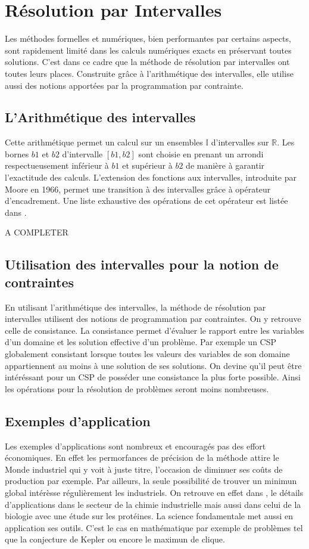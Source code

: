 \section{Résolution par Intervalles}
Les méthodes formelles et numériques, bien performantes par certains aspects, sont rapidement limité dans les calculs numériques exacts en préservant toutes solutions. C'est dans ce cadre que la méthode de résolution par intervalles ont toutes leurs places. Construite grâce à l'arithmétique des intervalles, elle utilise aussi des notions apportées par la programmation par contrainte.
 
\subsection{L'Arithmétique des intervalles}
Cette arithmétique permet un calcul sur un ensembles $\mathbb{I}$ d'intervalles sur $\mathbb{R}$. Les bornes $b1$ et $b2$ d'intervalle $[b1,b2]$ sont choisie en prenant un arrondi respectueusement inférieur à $b1$ et supérieur à $b2$ de manière à garantir l'exactitude des calculs. L'extension des fonctions aux intervalles, introduite par Moore en 1966, permet une transition à des intervalles grâce à opérateur d'encadrement. Une liste exhaustive des opérations de cet opérateur est listée dans \cite{Jermann}.

A COMPLETER

\subsection{Utilisation des intervalles pour la notion de contraintes}
En utilisant l'arithmétique des intervalles, la méthode de résolution par intervalles utilisent des notions de programmation par contraintes. On y retrouve celle de consistance. La consistance permet d'évaluer le rapport entre les variables d'un domaine et les solution effective d'un problème. Par exemple un CSP globalement consistant lorsque toutes les valeurs des variables de son domaine appartiennent au moins à une solution de ses solutions. On devine qu'il peut être intéréssant pour un CSP de posséder une consistance la plus forte possible. Ainsi les opérations pour la résolution de problèmes seront moins nombreuses. 


\subsection{Exemples d'application}
Les exemples d'applications sont nombreux et encouragés pas des effort économiques. En effet les permorfances de précision de la méthode attire le Monde industriel qui y voit à juste titre, l'occasion de diminuer ses coûts de production par exemple. Par ailleurs, la seule possibilité de trouver un minimun global intérèsse régulièrement les industriels. On retrouve en effet dans \cite{Schichl}, le détails d'applications dans le secteur de la chimie industrielle mais aussi dans celui de la biologie avec une étude sur les protéines.
 La science fondamentale met aussi en application ses outils. C'est le cas en mathématique par exemple de problèmes tel que la conjecture de Kepler ou encore le  maximun de clique.
